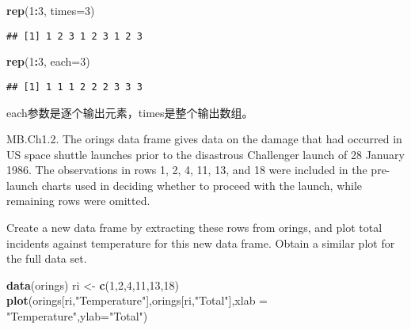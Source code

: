 \documentclass[hyperref,]{ctexart}
\newenvironment{Shaded}{\begin{snugshade}}{\end{snugshade}}
\newcommand{\DataTypeTok}[1]{\textcolor[rgb]{0.13,0.29,0.53}{#1}}
\newcommand{\DecValTok}[1]{\textcolor[rgb]{0.00,0.00,0.81}{#1}}
\newcommand{\KeywordTok}[1]{\textcolor[rgb]{0.13,0.29,0.53}{\textbf{#1}}}
\newcommand{\NormalTok}[1]{#1}
\newcommand{\OperatorTok}[1]{\textcolor[rgb]{0.81,0.36,0.00}{\textbf{#1}}}
\newcommand{\StringTok}[1]{\textcolor[rgb]{0.31,0.60,0.02}{#1}}
\begin{document}
\begin{Shaded}
\begin{Highlighting}[]
\KeywordTok{rep}\NormalTok{(}\DecValTok{1}\OperatorTok{:}\DecValTok{3}\NormalTok{, }\DataTypeTok{times=}\DecValTok{3}\NormalTok{)}
\end{Highlighting}
\end{Shaded}

\begin{verbatim}
## [1] 1 2 3 1 2 3 1 2 3
\end{verbatim}

\begin{Shaded}
\begin{Highlighting}[]
\KeywordTok{rep}\NormalTok{(}\DecValTok{1}\OperatorTok{:}\DecValTok{3}\NormalTok{, }\DataTypeTok{each=}\DecValTok{3}\NormalTok{)}
\end{Highlighting}
\end{Shaded}

\begin{verbatim}
## [1] 1 1 1 2 2 2 3 3 3
\end{verbatim}

each参数是逐个输出元素，times是整个输出数组。

MB.Ch1.2. The orings data frame gives data on the damage that had
occurred in US space shuttle launches prior to the disastrous Challenger
launch of 28 January 1986. The observations in rows 1, 2, 4, 11, 13, and
18 were included in the pre-launch charts used in deciding whether to
proceed with the launch, while remaining rows were omitted.

Create a new data frame by extracting these rows from orings, and plot
total incidents against temperature for this new data frame. Obtain a
similar plot for the full data set.

\begin{Shaded}
\begin{Highlighting}[]
\KeywordTok{data}\NormalTok{(orings)}
\NormalTok{ri <-}\StringTok{ }\KeywordTok{c}\NormalTok{(}\DecValTok{1}\NormalTok{,}\DecValTok{2}\NormalTok{,}\DecValTok{4}\NormalTok{,}\DecValTok{11}\NormalTok{,}\DecValTok{13}\NormalTok{,}\DecValTok{18}\NormalTok{)}
\KeywordTok{plot}\NormalTok{(orings[ri,}\StringTok{"Temperature"}\NormalTok{],orings[ri,}\StringTok{"Total"}\NormalTok{],}\DataTypeTok{xlab =} \StringTok{"Temperature"}\NormalTok{,}\DataTypeTok{ylab=}\StringTok{"Total"}\NormalTok{)}
\end{Highlighting}
\end{Shaded}
\end{document}
